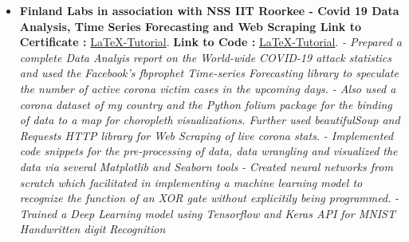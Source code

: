 \documentclass[a4paper,12pt]{article}
\begin{document}
\begin{itemize}
    \item{\textbf{\large{Finland Labs in association with NSS IIT Roorkee - Covid 19 Data Analysis, Time Series Forecasting and Web Scraping  }}
    \newline
    \textbf{Link to Certificate :} \href{http://www.latex-tutorial.com}{LaTeX-Tutorial}.
    \newline
    \textbf{ Link to Code :} \href{http://www.latex-tutorial.com}{LaTeX-Tutorial}.
    \newline
    \textit{- Prepared a complete Data Analyis report on the World-wide COVID-19 attack statistics and used the Facebook's fbprophet Time-series Forecasting library to speculate the number of active corona victim cases in the upcoming days.} 
    \newline
    \textit{- Also used a corona dataset of my country and the Python folium package for the binding of data to a map for choropleth visualizations. Further used beautifulSoup and Requests HTTP library for Web Scraping of live corona stats.}
    \newline
    \textit{- Implemented code snippets for the pre-processing of data, data wrangling and visualized the data via several Matplotlib and Seaborn tools }
    \newline
    \textit{- Created neural networks from scratch which facilitated in implementing a machine learning model to recognize the function of an XOR gate without explicitily being programmed.}
    \newline
    \textit{- Trained a Deep Learning model using Tensorflow and Keras API for MNIST Handwritten digit Recognition}}
    
\end{itemize}
\end{document}
